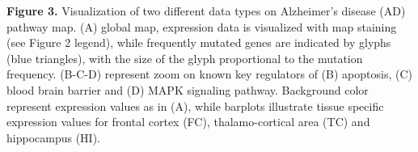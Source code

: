 \documentclass[a4,center,fleqn]{NAR}
\begin{document}
\textbf{Figure 3.} Visualization of two different data types on Alzheimer's
disease (AD) pathway map.  (A) global map, expression data is visualized with
map staining (see Figure 2 legend), while frequently mutated genes are indicated by
glyphs (blue triangles), with the size of the glyph proportional to the
mutation frequency. (B-C-D) represent zoom on known key regulators of (B)
apoptosis, (C) blood brain barrier and (D) MAPK signaling pathway. Background
color represent expression values as in (A), while barplots illustrate tissue
specific expression values for frontal cortex (FC), thalamo-cortical area (TC)
and hippocampus (HI).


\end{document}
